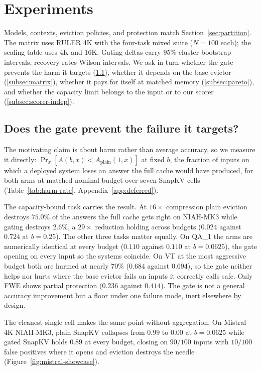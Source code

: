 \documentclass{article}
\begin{document}
\section{Experiments}
\label{sec:experiments}

Models, contexts, eviction policies, and protection match
Section~\ref{sec:partition}. The matrix uses RULER 4K with the four-task mixed
suite ($N = 100$ each); the scaling table uses 4K and 16K. Gating deltas carry
$95\%$ cluster-bootstrap intervals, recovery rates Wilson intervals. We ask in
turn whether the gate prevents the harm it targets (\ref{subsec:harm}),
whether it depends on the base evictor (\ref{subsec:matrix}), whether it pays
for itself at matched memory (\ref{subsec:pareto}), and whether the capacity
limit belongs to the input or to our scorer (\ref{subsec:scorer-indep}).

\subsection{Does the gate prevent the failure it targets?}
\label{subsec:harm}

The motivating claim is about harm rather than average accuracy, so we measure
it directly: $\Pr_x[A(b, x) < A_{\mathrm{plain}}(1, x)]$ at fixed $b$, the
fraction of inputs on which a deployed system loses an answer the full cache
would have produced, for both arms at matched nominal budget over seven SnapKV
cells (Table~\ref{tab:harm-rate}, Appendix~\ref{app:deferred}).

The capacity-bound task carries the result. At $16\times$ compression plain
eviction destroys $75.0\%$ of the answers the full cache gets right on NIAH-MK3 while gating destroys $2.6\%$, a $29\times$ reduction holding across
budgets ($0.024$ against $0.724$ at $b = 0.25$). The other three tasks matter
equally. On QA\_1 the arms are numerically identical at every budget ($0.110$
against $0.110$ at $b = 0.0625$), the gate opening on every input so the
systems coincide. On VT at the most aggressive budget both are harmed at
nearly $70\%$ ($0.684$ against $0.694$), so the gate neither helps nor hurts
where the base evictor fails on inputs it correctly calls safe. Only FWE shows
partial protection ($0.236$ against $0.414$). The gate is not a general
accuracy improvement but a floor under one failure mode, inert elsewhere by
design.

The cleanest single cell makes the same point without aggregation. On Mistral
4K NIAH-MK3, plain SnapKV collapses from $0.99$ to $0.00$ at $b = 0.0625$
while gated SnapKV holds $0.89$ at every budget, closing on $90/100$ inputs
with $10/100$ false positives where it opens and eviction destroys the needle
(Figure~\ref{fig:mistral-showcase}).
\end{document}
